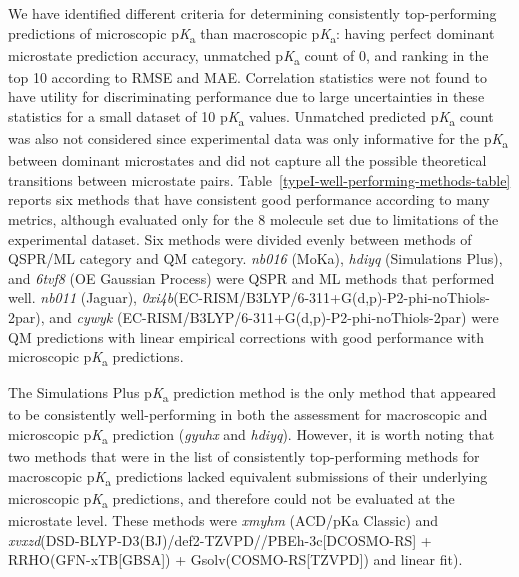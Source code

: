 \documentclass[9pt,lineno,final]{elife}
\newcommand{\pKa}{p\textit{K}\textsubscript{a}}
\begin{document}
We have identified different criteria for determining consistently top-performing predictions of microscopic \pKa{} than macroscopic \pKa{}: having perfect dominant microstate prediction accuracy, unmatched \pKa{} count of 0, and ranking in the top 10 according to RMSE and MAE. 
Correlation statistics were not found to have utility for discriminating performance due to large uncertainties in these statistics for a small dataset of 10 \pKa{} values. 
Unmatched predicted \pKa{} count was also not considered since experimental data was only informative for the \pKa{} between dominant microstates and did not capture all the possible theoretical transitions between microstate pairs. 
Table~\ref{typeI-well-performing-methods-table} reports six methods that have consistent good performance according to many metrics, although evaluated only for the 8 molecule set due to limitations of the experimental dataset. 
Six methods were divided evenly between methods of QSPR/ML category and QM category. 
\textit{nb016} (MoKa), \textit{hdiyq} (Simulations Plus), and \textit{6tvf8} (OE Gaussian Process) were QSPR and ML methods that performed well. 
\textit{nb011} (Jaguar), \textit{0xi4b}(EC-RISM/B3LYP/6-311+G(d,p)-P2-phi-noThiols-2par), and \textit{cywyk} (EC-RISM/B3LYP/6-311+G(d,p)-P2-phi-noThiols-2par) were QM predictions with linear empirical corrections with good performance with microscopic \pKa{} predictions. 

The Simulations Plus \pKa{} prediction method is the only method that appeared to be consistently well-performing in both the assessment for macroscopic and microscopic \pKa{} prediction (\textit{gyuhx} and \textit{hdiyq}). 
However, it is worth noting that two methods that were in the list of consistently top-performing methods for macroscopic \pKa{} predictions lacked equivalent submissions of their underlying microscopic \pKa{} predictions, and therefore could not be evaluated at the microstate level. 
These methods were \textit{xmyhm} (ACD/pKa Classic) and \textit{xvxzd}(DSD-BLYP-D3(BJ)/def2-TZVPD//PBEh-3c[DCOSMO-RS] + RRHO(GFN-xTB[GBSA]) + Gsolv(COSMO-RS[TZVPD]) and linear fit). 
\end{document}
